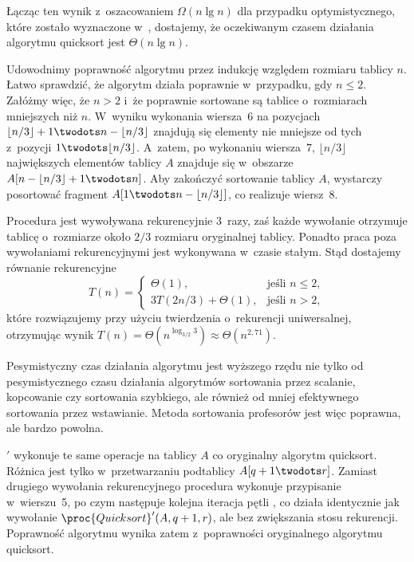 Łącząc ten wynik z~oszacowaniem $\Omega(n\lg n)$ dla przypadku optymistycznego, które zostało wyznaczone w~, dostajemy, że oczekiwanym czasem działania algorytmu quicksort jest $\Theta(n\lg n)$.


\subproblem %
Udowodnimy poprawność algorytmu przez indukcję względem rozmiaru tablicy $n$. Łatwo sprawdzić, że algorytm działa poprawnie w~przypadku, gdy $n\le2$. Załóżmy więc, że $n>2$ i~że poprawnie sortowane są tablice o~rozmiarach mniejszych niż $n$. W~wyniku wykonania wiersza~6 na pozycjach $\lfloor n/3\rfloor+1\twodots n-\lfloor n/3\rfloor$ znajdują się elementy nie mniejsze od tych z~pozycji $1\twodots\lfloor n/3\rfloor$. A~zatem, po wykonaniu wiersza~7, $\lfloor n/3\rfloor$ największych elementów tablicy $A$ znajduje się w~obszarze $A[n-\lfloor n/3\rfloor+1\twodots n]$. Aby zakończyć sortowanie tablicy $A$, wystarczy posortować fragment $A[1\twodots n-\lfloor n/3\rfloor]$, co realizuje wiersz~8.

\subproblem %
Procedura jest wywoływana rekurencyjnie 3~razy, zaś każde wywołanie otrzymuje tablicę o~rozmiarze około $2/3$ rozmiaru oryginalnej tablicy. Ponadto praca poza wywołaniami rekurencyjnymi jest wykonywana w~czasie stałym. Stąd dostajemy równanie rekurencyjne
\[
	T(n) =
	\begin{cases}
		\Theta(1), & \text{jeśli $n\le2$}, \\
		3T(2n/3)+\Theta(1), & \text{jeśli $n>2$},
	\end{cases}
\]
które rozwiązujemy przy użyciu twierdzenia o~rekurencji uniwersalnej, otrzymując wynik $T(n)=\Theta(n^{\log_{3/2}3})\approx \Theta(n^{2{,}71})$.

\subproblem %
Pesymistyczny czas działania algorytmu  jest wyższego rzędu nie tylko od pesymistycznego czasu działania algorytmów sortowania przez scalanie, kopcowanie czy sortowania szybkiego, ale również od mniej efektywnego sortowania przez wstawianie. Metoda sortowania profesorów jest więc poprawna, ale bardzo powolna.


\subproblem %
$'$ wykonuje te same operacje na tablicy $A$ co oryginalny algorytm quicksort. Różnica jest tylko w~przetwarzaniu podtablicy $A[q+1\twodots r]$. Zamiast drugiego wywołania rekurencyjnego procedura wykonuje przypisanie w~wierszu~5, po czym następuje kolejna iteracja pętli , co działa identycznie jak wywołanie $\proc{Quicksort}'(A,q+1,r)$, ale bez zwiększania stosu rekurencji. Poprawność algorytmu wynika zatem z~poprawności oryginalnego algorytmu quicksort.

